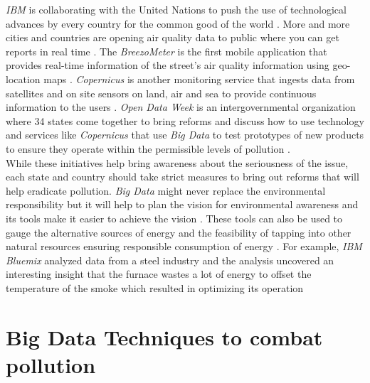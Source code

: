 \documentclass[sigconf]{acmart}
\begin{document}
{\em IBM} is collaborating with the United Nations to push the use of technological advances by every country for the common good of the world \cite{www-huff}. More and more cities and countries are opening air quality data to public where you can get reports in real time \cite{www-ferro}. The {\em BreezoMeter} is the first mobile application that provides real-time information of the street's air quality information using geo-location maps \cite{www-ferro}. {\em Copernicus} is another monitoring service that ingests data from satellites and on site sensors on land, air and sea to provide continuous information to the users \cite{www-ferro}. {\em Open Data Week} is an intergovernmental organization where 34 states come together to bring reforms and discuss how to use technology and services like {\em Copernicus} that use {\em Big Data} to test prototypes of new products to ensure they operate within the permissible levels of pollution \cite{www-ferro}. \\
While these initiatives help bring awareness about the seriousness of the issue, each state and country should take strict measures to bring out reforms that will help eradicate pollution. {\em Big Data} might never replace the environmental responsibility but it will help to plan the vision for environmental awareness and its tools make it easier to achieve the vision \cite{www-ferro}. These tools can also be used to gauge the alternative sources of energy and the feasibility of tapping into other natural resources ensuring responsible consumption of energy \cite{www-ferro}. For example, {\em IBM Bluemix} analyzed data from a steel industry and the analysis uncovered an interesting insight that the furnace wastes a lot of energy to offset the temperature of the smoke which resulted in optimizing its operation \cite{www-ibm1}

\section{Big Data Techniques to combat pollution}
\end{document}
